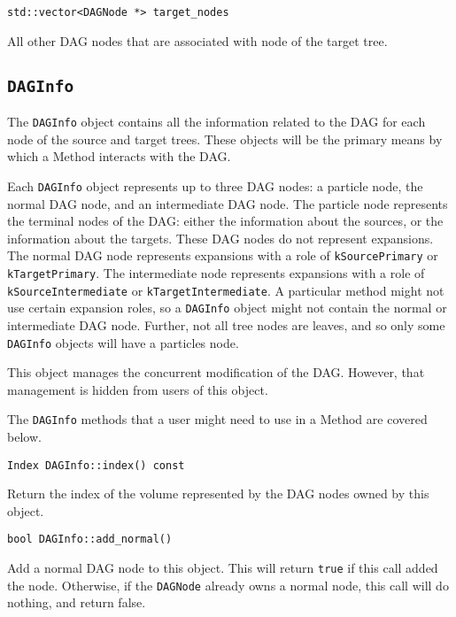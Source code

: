 \begin{lstlisting}
std::vector<DAGNode *> target_nodes
\end{lstlisting}

\noindent All other DAG nodes that are associated with node of the target tree.



\subsection{\texttt{DAGInfo}}

The \texttt{DAGInfo} object contains all the information related to the DAG
for each node of the source and target trees. These objects will be the
primary means by which a Method interacts with the DAG.

Each \texttt{DAGInfo} object represents up to three DAG nodes: a particle
node, the normal DAG node, and an intermediate DAG node. The particle node
represents the terminal nodes of the DAG: either the information about
the sources, or the information about the targets. These DAG nodes do not
represent expansions. The normal
DAG node represents expansions with a role of \texttt{kSourcePrimary} or
\texttt{kTargetPrimary}. The intermediate node represents expansions with a
role of \texttt{kSourceIntermediate} or \texttt{kTargetIntermediate}. A
particular method might not use certain expansion roles, so a
\texttt{DAGInfo} object might not contain the normal or intermediate DAG node.
Further, not all tree nodes are leaves, and so only some \texttt{DAGInfo}
objects will have a particles node.

This object manages the concurrent modification of the DAG. However, that
management is hidden from users of this object.

The \texttt{DAGInfo} methods that a user might need to use in a Method are
covered below.

\begin{lstlisting}
Index DAGInfo::index() const
\end{lstlisting}

\noindent Return the index of the volume represented by the DAG nodes owned by
this object.

\begin{lstlisting}
bool DAGInfo::add_normal()
\end{lstlisting}

\noindent Add a normal DAG node to this object. This will return \texttt{true}
if this call added the node. Otherwise, if the \texttt{DAGNode} already owns a
normal node, this call will do nothing, and return false.

